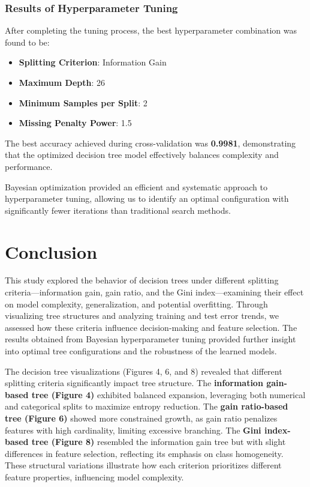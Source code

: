 \documentclass[12pt]{article}
\begin{document}
\subsubsection{Results of Hyperparameter Tuning}

After completing the tuning process, the best hyperparameter combination was found to be:

\begin{itemize}
    \item \textbf{Splitting Criterion}: Information Gain
    \item \textbf{Maximum Depth}: 26
    \item \textbf{Minimum Samples per Split}: 2
    \item \textbf{Missing Penalty Power}: 1.5
\end{itemize}

The best accuracy achieved during cross-validation was \textbf{0.9981}, demonstrating that the optimized decision tree model effectively balances complexity and performance.

Bayesian optimization provided an efficient and systematic approach to hyperparameter tuning, allowing us to identify an optimal configuration with significantly fewer iterations than traditional search methods.

\section{Conclusion}

This study explored the behavior of decision trees under different splitting criteria—information gain, gain ratio, and the Gini index—examining their effect on model complexity, generalization, and potential overfitting. Through visualizing tree structures and analyzing training and test error trends, we assessed how these criteria influence decision-making and feature selection. The results obtained from Bayesian hyperparameter tuning provided further insight into optimal tree configurations and the robustness of the learned models.

The decision tree visualizations (Figures 4, 6, and 8) revealed that different splitting criteria significantly impact tree structure. The \textbf{information gain-based tree (Figure 4)} exhibited balanced expansion, leveraging both numerical and categorical splits to maximize entropy reduction. The \textbf{gain ratio-based tree (Figure 6)} showed more constrained growth, as gain ratio penalizes features with high cardinality, limiting excessive branching. The \textbf{Gini index-based tree (Figure 8)} resembled the information gain tree but with slight differences in feature selection, reflecting its emphasis on class homogeneity. These structural variations illustrate how each criterion prioritizes different feature properties, influencing model complexity.
\end{document}
